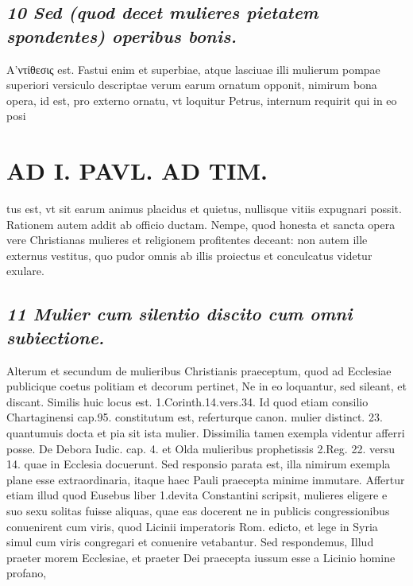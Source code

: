 \documentclass{article}
\begin{document}
\begin{pages}
\subsection*{\textit{10 Sed (quod decet mulieres pietatem spondentes) operibus bonis. }}\pstart A'ντίθεσις est. Fastui enim et superbiae, atque lasciuae illi mulierum pompae superiori versiculo descriptae verum earum ornatum opponit, nimirum bona opera, id est, pro externo ornatu, vt loquitur Petrus, internum requirit qui in eo posi\pend
\section*{AD I. PAVL. AD TIM. }
\marginpar{[ p.82 ]}\pstart tus est, vt sit earum animus placidus et quietus, nullisque vitiis expugnari possit. Rationem autem addit ab officio ductam. Nempe, quod honesta et sancta opera vere Christianas mulieres et religionem profitentes deceant: non autem ille externus vestitus, quo pudor omnis ab illis proiectus et conculcatus videtur exulare.  \pend
{}
{}
\subsection*{\textit{11 Mulier cum silentio discito cum omni subiectione. }}\pstart Alterum et secundum de mulieribus Christianis praeceptum, quod ad Ecclesiae publicique coetus politiam et decorum pertinet, Ne in eo loquantur, sed sileant, et discant. Similis huic locus est. 1.Corinth.14.vers.34. Id quod etiam consilio Chartaginensi cap.95. constitutum est, referturque  canon. mulier distinct. 23. quantumuis docta et pia sit ista mulier.  \pend\pstart Dissimilia tamen exempla videntur afferri posse. De Debora Iudic. cap. 4. et Olda mulieribus prophetissis 2.Reg. 22. versu 14. quae in Ecclesia docuerunt. Sed responsio parata est, illa nimirum exempla plane esse extraordinaria, itaque haec Pauli praecepta minime immutare. Affertur etiam illud quod Eusebus liber  1.devita Constantini scripsit, mulieres eligere e suo sexu solitas fuisse aliquas, quae eas docerent ne in publicis congressionibus conuenirent cum viris, quod Licinii imperatoris Rom. edicto, et lege in Syria simul cum viris congregari et conuenire vetabantur. Sed respondemus, Illud praeter morem Ecclesiae, et praeter Dei praecepta iussum esse a Licinio homine profano,  \pend

\end{pages}
\end{document}

